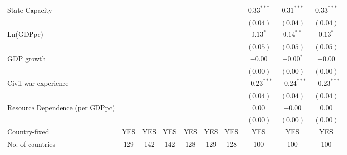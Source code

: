 \begin{table}
\begin{center}
\begin{tabular}{l c c c c c c c c c}
State Capacity                                         &              &              &          &              &               &              & $0.33^{***}$  & $0.31^{***}$  & $0.33^{***}$  \\
                                                       &              &              &          &              &               &              & $(0.04)$      & $(0.04)$      & $(0.04)$      \\
Ln(GDPpc)                                              &              &              &          &              &               &              & $0.13^{*}$    & $0.14^{**}$   & $0.13^{*}$    \\
                                                       &              &              &          &              &               &              & $(0.05)$      & $(0.05)$      & $(0.05)$      \\
GDP growth                                             &              &              &          &              &               &              & $-0.00$       & $-0.00^{*}$   & $-0.00$       \\
                                                       &              &              &          &              &               &              & $(0.00)$      & $(0.00)$      & $(0.00)$      \\
Civil war experience                                   &              &              &          &              &               &              & $-0.23^{***}$ & $-0.24^{***}$ & $-0.23^{***}$ \\
                                                       &              &              &          &              &               &              & $(0.04)$      & $(0.04)$      & $(0.04)$      \\
Resource Dependence (per GDPpc)                        &              &              &          &              &               &              & $0.00$        & $-0.00$       & $0.00$        \\
                                                       &              &              &          &              &               &              & $(0.00)$      & $(0.00)$      & $(0.00)$      \\
\hline
Country-fixed                                          & YES          & YES          & YES      & YES          & YES           & YES          & YES           & YES           & YES           \\
No. of countries                                       & 129          & 142          & 142      & 128          & 129           & 128          & 100           & 100           & 100           \\

\end{tabular}
\end{center}
\end{table}
